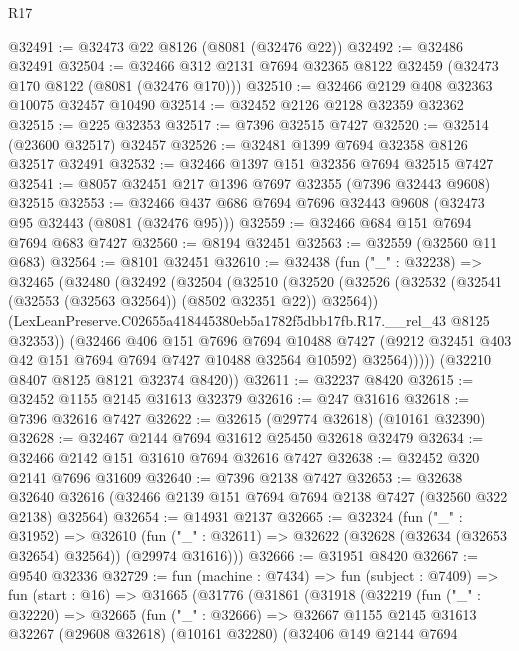\begin{lexlean}{R17}
\begin{coremodule}
@32491 := @32473 @22 @8126 (@8081 (@32476 @22))
@32492 := @32486 @32491
@32504 := @32466 @312 @2131 @7694 @32365 @8122 @32459 (@32473 @170 @8122 (@8081 (@32476 @170)))
@32510 := @32466 @2129 @408 @32363 @10075 @32457 @10490
@32514 := @32452 @2126 @2128 @32359 @32362
@32515 := @225 @32353
@32517 := @7396 @32515 @7427
@32520 := @32514 (@23600 @32517) @32457
@32526 := @32481 @1399 @7694 @32358 @8126 @32517 @32491
@32532 := @32466 @1397 @151 @32356 @7694 @32515 @7427
@32541 := @8057 @32451 @217 @1396 @7697 @32355 (@7396 @32443 @9608) @32515
@32553 := @32466 @437 @686 @7694 @7696 @32443 @9608 (@32473 @95 @32443 (@8081 (@32476 @95)))
@32559 := @32466 @684 @151 @7694 @7694 @683 @7427
@32560 := @8194 @32451
@32563 := @32559 (@32560 @11 @683)
@32564 := @8101 @32451
@32610 := @32438
    (fun ("_" : @32238) =>
    @32465
      (@32480
        (@32492
          (@32504
            (@32510
              (@32520
                (@32526 (@32532 (@32541 (@32553 (@32563 @32564)) (@8502 @32351 @22)) @32564))
                (LexLeanPreserve.C02655a418445380eb5a1782f5dbb17fb.R17.__rel_43 @8125 @32353))
              (@32466
                @406
                @151
                @7696
                @7694
                @10488
                @7427
                (@9212 @32451 @403 @42 @151 @7694 @7694 @7427 @10488 @32564 @10592)
                @32564)))))
      (@32210 @8407 @8125 @8121 @32374 @8420))
@32611 := @32237 @8420
@32615 := @32452 @1155 @2145 @31613 @32379
@32616 := @247 @31616
@32618 := @7396 @32616 @7427
@32622 := @32615 (@29774 @32618) (@10161 @32390)
@32628 := @32467 @2144 @7694 @31612 @25450 @32618 @32479
@32634 := @32466 @2142 @151 @31610 @7694 @32616 @7427
@32638 := @32452 @320 @2141 @7696 @31609
@32640 := @7396 @2138 @7427
@32653 := @32638
    @32640
    @32616
    (@32466 @2139 @151 @7694 @7694 @2138 @7427 (@32560 @322 @2138) @32564)
@32654 := @14931 @2137
@32665 := @32324
    (fun ("_" : @31952) =>
    @32610 (fun ("_" : @32611) => @32622 (@32628 (@32634 (@32653 @32654) @32564)) (@29974 @31616)))
@32666 := @31951 @8420
@32667 := @9540 @32336
@32729 := fun (machine : @7434) =>
  fun (subject : @7409) =>
  fun (start : @16) =>
  @31665
    (@31776
      (@31861
        (@31918
          (@32219
            (fun ("_" : @32220) =>
            @32665
              (fun ("_" : @32666) =>
              @32667
                @1155
                @2145
                @31613
                @32267
                (@29608 @32618)
                (@10161 @32280)
                (@32406
                  @149
                  @2144
                  @7694

\end{coremodule}
\end{lexlean}
